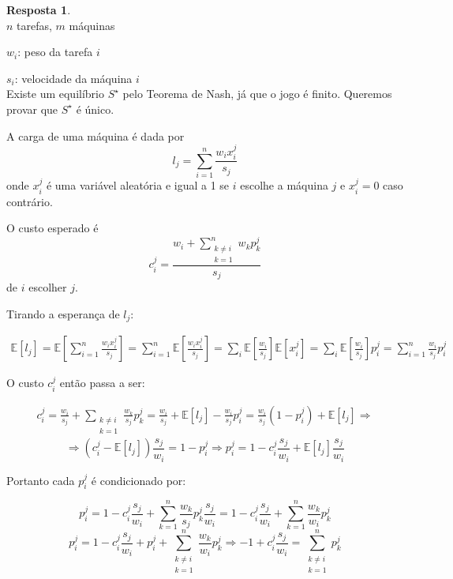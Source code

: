 \documentclass{amsart}
\theoremstyle{plain}
\theoremstyle{definition}
\newtheorem{answer}{Resposta}
\numberwithin{equation}{section}
\newcommand{\expected}{\mathbb{E}}
\renewcommand{\implies}{\Rightarrow}
\begin{document}
\begin{answer}~\\

  $n$ tarefas, $m$ máquinas

  $w_i$: peso da tarefa $i$

  $s_i$: velocidade da máquina $i$\\

  Existe um equilíbrio $S^\star$ pelo Teorema de Nash, já que o jogo é finito. Queremos provar que
  $S^\star$ é único.

  A carga de uma máquina é dada por
  \begin{equation*}
    l_j = \sum_{i=1}^n \frac{w_i x_i^j}{s_j}
  \end{equation*}
  onde $x_i^j$ é uma variável aleatória e igual a 1 se $i$ escolhe a máquina $j$ e $x_i^j=0$ caso
  contrário.

  O custo esperado é
  \begin{equation*}
    c_i^j = \frac{w_i + \sum_{\substack{k\neq i\\k=1}}^n w_k p_k^j}{s_j}
  \end{equation*}
  de $i$ escolher $j$.

  Tirando a esperança de $l_j$:

  \begin{align*}
    \expected[l_j] = \expected\left[\sum_{i=1}^n \frac{w_i x_i^j}{s_j}\right] = \sum_{i=1}^n
      \expected\left[\frac{w_i x_i^j}{s_j}\right] = \sum_i\expected\left[\frac{w_i}{s_j}\right]
      \expected[x_i^j]=\sum_i\expected\left[\frac{w_i}{s_j}\right] p_i^j=\sum_{i=1}^n
      \frac{w_i}{s_j}p_i^j
  \end{align*}

  O custo $c_i^j$ então passa a ser:

  \begin{align*}
    c_i^j = \frac{w_i}{s_j} + \sum_{\substack{k\neq i\\k=1}}\frac{w_k}{s_j} p_k^j=\frac{w_i}{s_j}+
      \expected[l_j]-\frac{w_i}{s_j}p_i^j=\frac{w_i}{s_j}(1-p_i^j)+\expected[l_j]\implies
  \end{align*}
  \begin{equation*}
    \implies (c_i^j-\expected[l_j])\frac{s_j}{w_i}=1-p_i^j\implies p_i^j=1-c_i^j\frac{s_j}{w_i}+
      \expected[l_j]\frac{s_j}{w_i}
  \end{equation*}

  Portanto cada $p_i^j$ é condicionado por:

  \begin{equation*}
    p_i^j=1-c_i^j\frac{s_j}{w_i}+\sum_{k=1}^n\frac{w_k}{s_j}p_k^j\frac{s_j}{w_i}=1-c_i^j
      \frac{s_j}{w_i}+\sum_{k=1}^n\frac{w_k}{w_i}p_k^j
  \end{equation*}
  \begin{equation*}
    p_i^j=1-c_i^j\frac{s_j}{w_i}+p_i^j+\sum_{\substack{k\neq i\\k=1}}^n\frac{w_k}{w_i}p_k^j\implies
      -1+c_i^j \frac{s_j}{w_i}=\sum_{\substack{k\neq i\\k=1}}^n p_k^j
  \end{equation*}


\end{answer}
\end{document}
